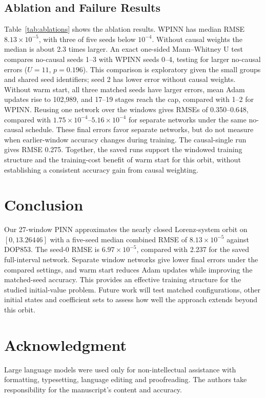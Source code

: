 \documentclass[conference,a4paper]{IEEEtran}
\begin{document}
\subsection{Ablation and Failure Results}
\label{subsec:ablation-results}
Table~\ref{tab:ablations} shows the ablation results. WPINN has median RMSE $8.13\times10^{-5}$, with three of five seeds below $10^{-4}$. Without causal weights the median is about 2.3 times larger. An exact one-sided Mann--Whitney U test compares no-causal seeds 1--3 with WPINN seeds 0--4, testing for larger no-causal errors ($U=11$, $p=0.196$). This comparison is exploratory given the small groups and shared seed identifiers; seed 2 has lower error without causal weights. Without warm start, all three matched seeds have larger errors, mean Adam updates rise to 102,989, and 17--19 stages reach the cap, compared with 1--2 for WPINN. Reusing one network over the windows gives RMSEs of 0.350--0.648, compared with $1.75\times10^{-4}$--$5.16\times10^{-4}$ for separate networks under the same no-causal schedule. These final errors favor separate networks, but do not measure when earlier-window accuracy changes during training. The causal-single run gives RMSE 0.275. Together, the saved runs support the windowed training structure and the training-cost benefit of warm start for this orbit, without establishing a consistent accuracy gain from causal weighting.

\section{Conclusion}

Our 27-window PINN approximates the nearly closed Lorenz-system orbit on $[0,13.26446]$ with a five-seed median combined RMSE of $8.13\times10^{-5}$ against DOP853. The seed-0 RMSE is $6.97\times10^{-5}$, compared with 2.237 for the saved full-interval network. Separate window networks give lower final errors under the compared settings, and warm start reduces Adam updates while improving the matched-seed accuracy. This provides an effective training structure for the studied initial-value problem. Future work will test matched configurations, other initial states and coefficient sets to assess how well the approach extends beyond this orbit.








\section*{Acknowledgment}
Large language models were used only for non-intellectual assistance with formatting, typesetting, language editing and proofreading. The authors take responsibility for the manuscript's content and accuracy.



\end{document}
